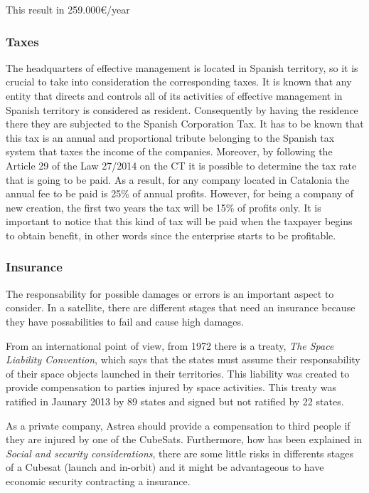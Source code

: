 This result in 259.000\euro/year
\subsubsection{Taxes}
The headquarters of effective management is located in Spanish territory, so it is crucial to take into consideration the corresponding taxes. It is known that any entity that directs and controls all of its activities of effective management in Spanish territory is considered as resident. Consequently by having the residence there they are subjected to the Spanish Corporation Tax. It has to be known that this tax is an annual and proportional tribute belonging to the Spanish tax system that taxes the income of the companies.
\newline
\newline
Moreover, by following the Article 29 of the Law 27/2014 on the CT it is possible to determine the tax rate that is going to be paid. As a result, for any company located in Catalonia the annual fee to be paid is 25\% of annual profits. However, for being a company of new creation, the first two years the tax will be 15\% of profits only. It is important to notice that this kind of tax will be paid when the taxpayer begins to obtain benefit, in other words since the enterprise starts to be profitable.   
\subsubsection{Insurance}

The responsability for possible damages or errors is an important aspect to consider. In a satellite, there are different stages that need an insurance because they have possabilities to fail and cause high damages.

From an international point of view, from 1972 there is a treaty, \textit{The Space Liability Convention}, which says that the states must assume their responsability of their space objects launched in their territories. This liability was created to provide compensation to parties injured by space activities. This treaty was ratified in Jaunary 2013 by 89 states and signed but not ratified by 22 states. \cite{UN}

As a private company, Astrea should provide a compensation to third people if they are injured by one of the CubeSats. Furthermore,  how has been explained in \textit{Social and security considerations}, there are some little risks in differents stages of a Cubesat (launch and in-orbit) and it might be advantageous to have economic security contracting a insurance. 

